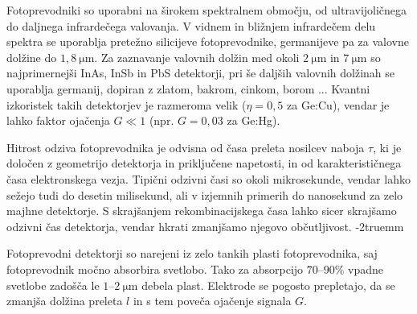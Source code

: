 %  

Fotoprevodniki so uporabni na širokem spektralnem območju, od ultra\-vijoličnega
do daljnega infra\-rdečega valovanja. 
V vidnem in bližnjem infrardečem delu spektra se 
uporablja pretežno silicijeve fotoprevodnike, germanijeve
pa za valovne dolžine do $1,8~\si{\micro\meter}$. Za zaznavanje valovnih dolžin med okoli 
$2~\si{\micro\meter}$ in $7~\si{\micro\meter}$ so najprimernejši InAs, InSb in PbS detektorji, 
pri še daljših valovnih dolžinah se uporablja germanij, dopiran z zlatom, bakrom, cinkom, borom ...
Kvantni izkoristek takih detektorjev je razmeroma velik ($\eta = 0,5$ za Ge:Cu), vendar
je lahko faktor ojačenja $G \ll 1$ (npr. $G = 0,03$ za Ge:Hg). 

Hitrost odziva fotoprevodnika je odvisna od časa preleta nosilcev naboja $\tau$,
ki je določen z geometrijo detektorja in priključene napetosti, 
in od karakterističnega časa elektronskega vezja. 
Tipični odzivni časi so okoli mikrosekunde, vendar lahko sežejo
tudi do desetin milisekund, ali v izjemnih primerih do nanosekund za zelo majhne detektorje.
S skrajšanjem rekombinacijskega časa lahko sicer skrajšamo odzivni čas detektorja, 
vendar hkrati zmanjšamo njegovo občutljivost.
\vglue-2truemm
\begin{remark}
Fotoprevodni detektorji so narejeni iz zelo tankih plasti fotoprevodnika, saj fotoprevodnik močno absorbira
svetlobo. Tako za absorpcijo $70$--$90\%$ vpadne svetlobe zadošča le $1$--$2~\si{\micro\meter}$ debela plast.
Elektrode se pogosto prepletajo, da se zmanjša dolžina preleta $l$ in s tem poveča ojačenje signala $G$. 
\end{remark}

